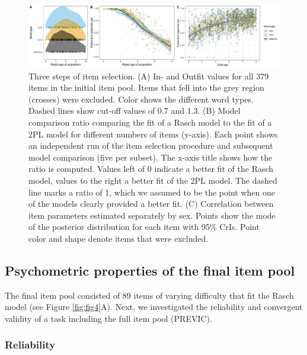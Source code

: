\documentclass[
  man,floatsintext]{apa6}
\begin{document}
\begin{figure}

{\centering \includegraphics[width=1\linewidth]{../graphs/fig3} 

}

\caption{Three steps of item selection. (A) In- and Outfit values for all 379 items in the initial item pool. Items that fell into the grey region (crosses) were excluded. Color shows the different word types. Dashed lines show cut-off values of 0.7 and 1.3. (B) Model comparison ratio comparing the fit of a Rasch model to the fit of a 2PL model for different numbers of items (y-axis). Each point shows an independent run of the item selection procedure and subsequent model comparison (five per subset). The x-axis title shows how the ratio is computed. Values left of 0 indicate a better fit of the Rasch model, values to the right a better fit of the 2PL model. The dashed line marks a ratio of 1, which we assumed to be the point when one of the models clearly provided a better fit. (C) Correlation between item parameters estimated separately by sex. Points show the mode of the posterior distribution for each item with 95\% CrIs. Point color and shape denote items that were excluded.}\label{fig:fig3}
\end{figure}

\hypertarget{psychometric-properties-of-the-final-item-pool}{%
\subsection{Psychometric properties of the final item pool}\label{psychometric-properties-of-the-final-item-pool}}

The final item pool consisted of 89 items of varying difficulty that fit the Rasch model (see Figure \ref{fig:fig4}A). Next, we investigated the reliability and convergent validity of a task including the full item pool (PREVIC).

\hypertarget{reliability}{%
\subsubsection{Reliability}\label{reliability}}
\end{document}
